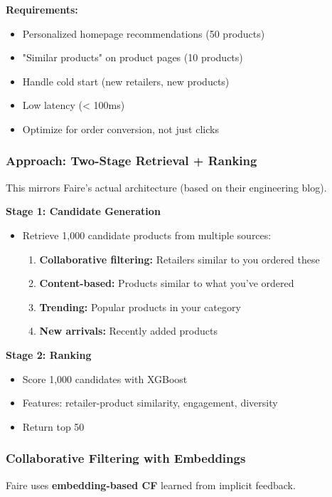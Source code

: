 \documentclass[11pt,letterpaper]{article}
\begin{document}
\textbf{Requirements:}
\begin{itemize}
    \item Personalized homepage recommendations (50 products)
    \item "Similar products" on product pages (10 products)
    \item Handle cold start (new retailers, new products)
    \item Low latency (< 100ms)
    \item Optimize for order conversion, not just clicks
\end{itemize}

\subsubsection{Approach: Two-Stage Retrieval + Ranking}

This mirrors Faire's actual architecture (based on their engineering blog).

\textbf{Stage 1: Candidate Generation}
\begin{itemize}
    \item Retrieve 1,000 candidate products from multiple sources:
    \begin{enumerate}
        \item \textbf{Collaborative filtering:} Retailers similar to you ordered these
        \item \textbf{Content-based:} Products similar to what you've ordered
        \item \textbf{Trending:} Popular products in your category
        \item \textbf{New arrivals:} Recently added products
    \end{enumerate}
\end{itemize}

\textbf{Stage 2: Ranking}
\begin{itemize}
    \item Score 1,000 candidates with XGBoost
    \item Features: retailer-product similarity, engagement, diversity
    \item Return top 50
\end{itemize}

\subsubsection{Collaborative Filtering with Embeddings}

Faire uses \textbf{embedding-based CF} learned from implicit feedback.
\end{document}
